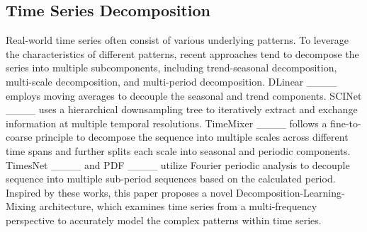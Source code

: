 \subsection{Time Series Decomposition}
Real-world time series often consist of various underlying patterns. To leverage the characteristics of different patterns, recent approaches tend to decompose the series into multiple subcomponents, including trend-seasonal decomposition, multi-scale decomposition, and multi-period decomposition. DLinear ____ employs moving averages to decouple the seasonal and trend components.  SCINet ____ uses a hierarchical downsampling tree to iteratively extract and exchange information at multiple temporal resolutions. TimeMixer ____ follows a fine-to-coarse principle to decompose the sequence into multiple scales across different time spans and further splits each scale into seasonal and periodic components. TimesNet ____ and PDF ____ utilize Fourier periodic analysis to decouple sequence into multiple sub-period sequences based on the calculated period.
Inspired by these works, this paper proposes a novel Decomposition-Learning-Mixing architecture, which examines time series from a multi-frequency perspective to accurately model the complex patterns within time series.